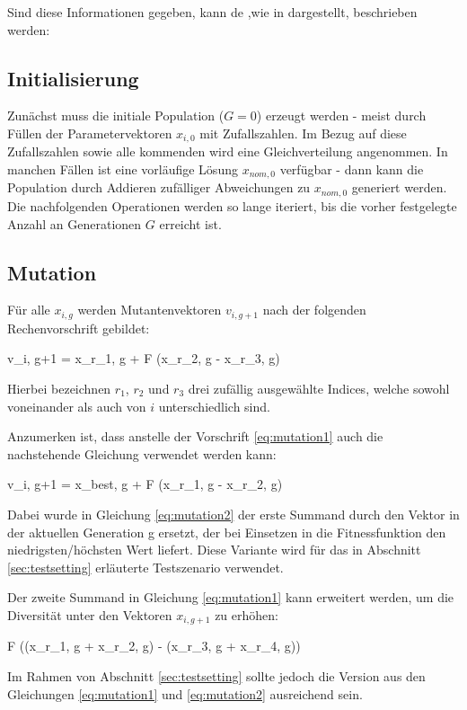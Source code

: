 		Sind diese Informationen gegeben, kann \gls{de} ,wie in \cite{storn-price-de} dargestellt, beschrieben werden:
		
		\subsection{Initialisierung}
		\label{sec:de-init}
		
			Zunächst muss die initiale Population ($G = 0$) erzeugt werden - meist durch Füllen der Parametervektoren $x_{i, 0}$ mit Zufallszahlen. Im Bezug auf diese Zufallszahlen sowie alle kommenden wird eine Gleichverteilung angenommen. In manchen Fällen ist eine vorläufige Lösung $x_{nom, 0}$ verfügbar - dann kann die Population durch Addieren zufälliger Abweichungen zu $x_{nom, 0}$ generiert werden. Die nachfolgenden Operationen werden so lange iteriert, bis die vorher festgelegte Anzahl an Generationen $G$ erreicht ist.
			
		\subsection{Mutation}
		\label{sec:de-mutation}
		
			Für alle $x_{i, g}$ werden Mutantenvektoren $v_{i, g+1}$ nach der folgenden Rechenvorschrift gebildet:
			\Large
			\begin{flalign}
				\label{eq:mutation1}
				v_{i, g+1} = x_{r_{1}, g} + F \cdot (x_{r_{2}, g} - x_{r_{3}, g})
			\end{flalign}
			\normalsize
			Hierbei bezeichnen $r_{1}$, $r_{2}$ und $r_{3}$ drei zufällig ausgewählte Indices, welche sowohl voneinander als auch von $i$ unterschiedlich sind.
			
			Anzumerken ist, dass anstelle der Vorschrift \ref{eq:mutation1} auch die nachstehende Gleichung verwendet werden kann:
			\Large
			\begin{flalign}
				\label{eq:mutation2}
				v_{i, g+1} = x_{best, g} + F \cdot (x_{r_{1}, g} - x_{r_{2}, g})
			\end{flalign}
			\normalsize
			Dabei wurde in Gleichung \ref{eq:mutation2} der erste Summand durch den Vektor in der aktuellen Generation g ersetzt, der bei Einsetzen in die Fitnessfunktion den niedrigsten/höchsten Wert liefert. Diese Variante wird für das in Abschnitt \ref{sec:testsetting} erläuterte Testszenario verwendet.
			
			Der zweite Summand in Gleichung \ref{eq:mutation1} kann erweitert werden, um die Diversität unter den Vektoren $x_{i, g+1}$ zu erhöhen:
			\Large
			\begin{flalign}
				\label{eq:mutation3}
				F \cdot ((x_{r_{1}, g} + x_{r_{2}, g}) - (x_{r_{3}, g} + x_{r_{4}, g}))
			\end{flalign}
			\normalsize
			Im Rahmen von Abschnitt \ref{sec:testsetting} sollte jedoch die Version aus den Gleichungen \ref{eq:mutation1} und \ref{eq:mutation2} ausreichend sein.
			
